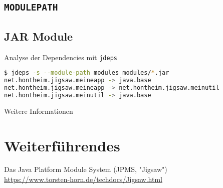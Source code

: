 \documentclass[aspectratio=169,x11names,11pt]{beamer}
\begin{document}
\begin{frame}{\bspeins}
\subsection{\texttt{MODULEPATH}}
\label{bsp1}

\end{frame}

\begin{frame}{\bspzwei}
\subsection{JAR Module}
\label{bsp2}

\end{frame}

\begin{frame}[fragile]{\bspzwei}{Analyse der Dependencies mit \texttt{jdeps}}
\begin{lstlisting}[language=sh,xleftmargin=0pt,xrightmargin=0pt]
$ jdeps -s --module-path modules modules/*.jar
net.hontheim.jigsaw.meineapp -> java.base
net.hontheim.jigsaw.meineapp -> net.hontheim.jigsaw.meinutil
net.hontheim.jigsaw.meinutil -> java.base
\end{lstlisting}
\end{frame}

\begin{frame}{Weitere Informationen}
\section{Weiterführendes}
Das Java Platform Module System (JPMS, "Jigsaw")\\
\url{https://www.torsten-horn.de/techdocs/Jigsaw.html}
\end{frame}

% 
%
\end{document}
